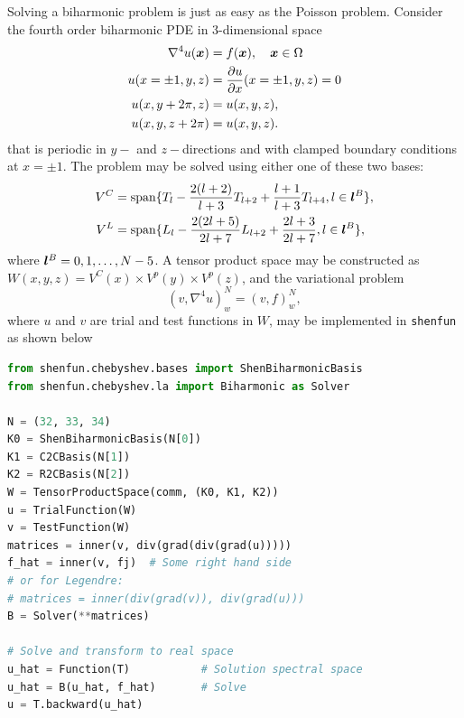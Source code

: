 \documentclass[%
oneside,                 %
final,                   %
10pt]{article}
\theoremstyle{definition}
\begin{document}
Solving a biharmonic problem is just as easy as the Poisson problem. Consider the fourth order biharmonic PDE in 3-dimensional space
\begin{align}
\nabla^4 u(\boldsymbol{x}) &= f(\boldsymbol{x}), \quad \boldsymbol{x} \in \Omega \\ 
 u(x=\pm1, y, z) &= \frac{\partial u}{\partial x} (x=\pm 1, y, z) = 0 \\ 
 u(x, y+2\pi, z) &= u(x, y, z), \\ 
 u(x, y, z+2\pi) &= u(x, y, z). 
\end{align}
that is periodic in $y-$ and $z-$directions and with clamped boundary conditions at $x=\pm 1$. The problem may be solved using either one of these two bases:
\begin{align}
V^C &= \text{span}\{T_l - \frac{2(l+2)}{l+3}T_{l+2} + \frac{l+1}{l+3}T_{l+4} , l \in \boldsymbol{l}^B\}, \label{eq:chebbiharmonic} \\ 
V^L &= \text{span}\{L_l - \frac{2(2l+5)}{2l+7}L_{l+2} + \frac{2l+3}{2l+7}, l \in \boldsymbol{l}^B\}, \label{eq:legbiharmonic}
\end{align}
where $\boldsymbol{l}^B = 0, 1, \ldots, N-5$. A tensor product space may be constructed as $W(x,y,z) = V^C(x) \times V^p(y) \times V^p(z)$, and the variational problem 
\begin{equation}
(v, \nabla^4 u)^N_w = (v, f)^N_w,
\end{equation}
where $u$ and $v$ are trial and test functions in $W$, may be implemented in \texttt{shenfun} as shown below
\begin{lstlisting}[language=Python,style=yellow2_fb]
from shenfun.chebyshev.bases import ShenBiharmonicBasis
from shenfun.chebyshev.la import Biharmonic as Solver

N = (32, 33, 34)
K0 = ShenBiharmonicBasis(N[0])
K1 = C2CBasis(N[1])
K2 = R2CBasis(N[2])
W = TensorProductSpace(comm, (K0, K1, K2))
u = TrialFunction(W)
v = TestFunction(W)
matrices = inner(v, div(grad(div(grad(u)))))
f_hat = inner(v, fj)  # Some right hand side
# or for Legendre:
# matrices = inner(div(grad(v)), div(grad(u)))
B = Solver(**matrices)

# Solve and transform to real space
u_hat = Function(T)           # Solution spectral space
u_hat = B(u_hat, f_hat)       # Solve
u = T.backward(u_hat)
\end{lstlisting}

\end{document}
